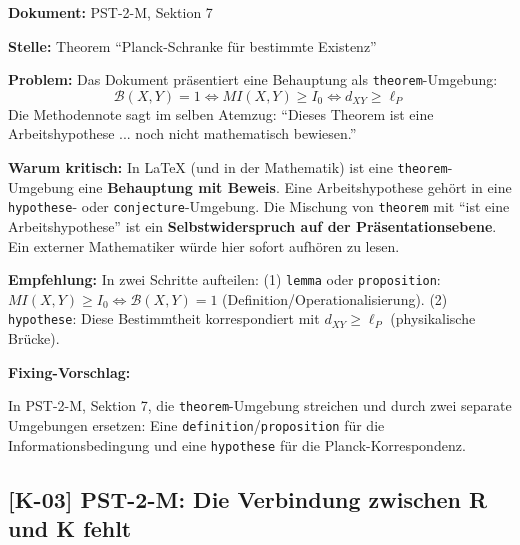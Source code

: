 \documentclass[11pt,a4paper]{article}
\newcommand{\K}[1]{\textbf{[K-#1]}}
\newcommand{\Dok}[1]{\noindent\textbf{Dokument:} #1\par\smallskip}
\newcommand{\Stelle}[1]{\noindent\textbf{Stelle:} #1\par\smallskip}
\newcommand{\Prob}[1]{\noindent\textbf{Problem:} #1\par\smallskip}
\newcommand{\Krit}[1]{\noindent\textbf{Warum kritisch:} #1\par\smallskip}
\newcommand{\Empf}[1]{\noindent\textbf{Empfehlung:} #1\par\smallskip}
\newenvironment{Fix}
  {\par\medskip\noindent\textbf{Fixing-Vorschlag:}\par\nobreak\smallskip}
  {\par\medskip}
\begin{document}
\Dok{PST-2-M, Sektion 7}
\Stelle{Theorem ``Planck-Schranke für bestimmte Existenz''}
\Prob{Das Dokument präsentiert eine Behauptung als
\texttt{theorem}-Umgebung:
\[
  \mathcal{B}(X,Y) = 1 \iff MI(X,Y) \geq I_0 \iff d_{XY} \geq \ell_P
\]
Die Methodennote sagt im selben Atemzug: ``Dieses Theorem ist eine
Arbeitshypothese ... noch nicht mathematisch bewiesen.''}
\Krit{In LaTeX (und in der Mathematik) ist eine \texttt{theorem}-Umgebung
eine \textbf{Behauptung mit Beweis}. Eine Arbeitshypothese gehört in
eine \texttt{hypothese}- oder \texttt{conjecture}-Umgebung. Die Mischung
von \texttt{theorem} mit ``ist eine Arbeitshypothese'' ist ein
\textbf{Selbstwiderspruch auf der Präsentationsebene}. Ein externer
Mathematiker würde hier sofort aufhören zu lesen.}
\Empf{In zwei Schritte aufteilen: (1) \texttt{lemma} oder
\texttt{proposition}: $MI(X,Y) \geq I_0 \iff \mathcal{B}(X,Y) = 1$
(Definition/Operationalisierung). (2) \texttt{hypothese}: Diese
Bestimmtheit korrespondiert mit $d_{XY} \geq \ell_P$
(physikalische Brücke).}
\begin{Fix}
In PST-2-M, Sektion 7, die \texttt{theorem}-Umgebung streichen und
durch zwei separate Umgebungen ersetzen: Eine
\texttt{definition}/\texttt{proposition} für die
Informationsbedingung und eine \texttt{hypothese} für die
Planck-Korrespondenz.
\end{Fix}

\subsection{\K{03} PST-2-M: Die Verbindung zwischen \textbf{R} und \textbf{K} fehlt}
\end{document}

